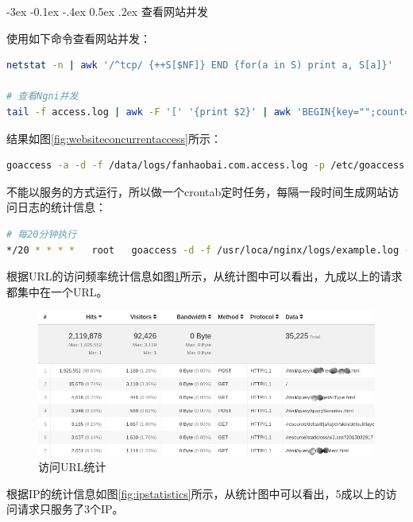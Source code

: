 \documentclass[8pt]{book}
\makeatletter
\numberwithin{dummy}{section}
\theoremstyle{ocrenumbox}
\theoremstyle{blacknumex}
\theoremstyle{blacknumbox}
\theoremstyle{ocrenum}
\renewcommand{\subsection}{\@startsection {subsection}{2}{\z@}
	{-3ex \@plus -0.1ex \@minus -.4ex}
	{0.5ex \@plus.2ex }
	{\normalfont\sffamily\bfseries}}
\makeatother
\begin{document}
\subsection{查看网站并发}

使用如下命令查看网站并发：

\begin{lstlisting}[language=Bash]
netstat -n | awk '/^tcp/ {++S[$NF]} END {for(a in S) print a, S[a]}'

# 查看Ngni并发
tail -f access.log | awk -F '[' '{print $2}' | awk 'BEGIN{key="";count=0}{if(key==$1){count++}else{printf("%s\t%d\r\n", key, count);count=1;key=$1}}'
\end{lstlisting}

结果如图\ref{fig:websiteconcurrentaccess}所示：



\begin{lstlisting}[language=Bash]
goaccess -a -d -f /data/logs/fanhaobai.com.access.log -p /etc/goaccess.conf -o /data/html/hexo/public/go-access.html
\end{lstlisting}

不能以服务的方式运行，所以做一个crontab定时任务，每隔一段时间生成网站访问日志的统计信息：

\begin{lstlisting}[language=Bash]
# 每20分钟执行
*/20 * * * *   root   goaccess -d -f /usr/loca/nginx/logs/example.log -p /usr/local/etc/goaccess.conf
\end{lstlisting}

根据URL的访问频率统计信息如图\ref{fig:spideranalysis}所示，从统计图中可以看出，九成以上的请求都集中在一个URL。

\begin{figure}[htbp]
	\centering
	\includegraphics[scale=0.35]{spideranalysis.png}
	\caption{访问URL统计}
	\label{fig:spideranalysis}
\end{figure}


根据IP的统计信息如图\ref{fig:ipstatistics}所示，从统计图中可以看出，5成以上的访问请求只服务了3个IP。
\end{document}
